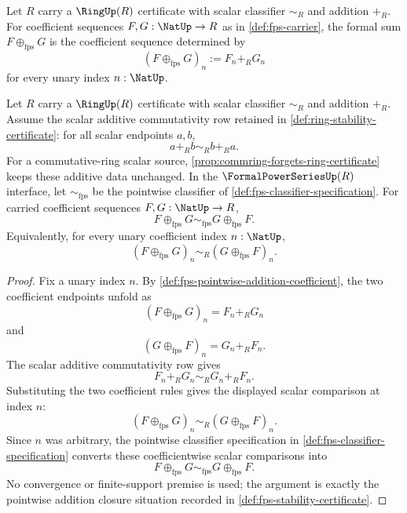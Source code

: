 \begin{definition}
\label{def:fps-pointwise-addition-coefficient}
Let $R$ carry a $\RingUp(R)$ certificate with scalar classifier $\sim_R$ and addition $+_R$. For coefficient sequences $F,G:\NatUp\to R$ as in \autoref{def:fps-carrier}, the formal sum $F\oplus_{\mathrm{fps}}G$ is the coefficient sequence determined by
$$
(F\oplus_{\mathrm{fps}}G)_n:=F_n+_R G_n
$$
for every unary index $n:\NatUp$.
\end{definition}

\begin{theorem}
\label{thm:fps-addition-commutativity-from-scalar-additive-commutativity}
Let $R$ carry a $\RingUp(R)$ certificate with scalar classifier $\sim_R$ and addition $+_R$. Assume the scalar additive commutativity row retained in \autoref{def:ring-stability-certificate}: for all scalar endpoints $a,b$,
$$
a+_R b\sim_R b+_R a.
$$
For a commutative-ring scalar source, \autoref{prop:commring-forgets-ring-certificate} keeps these additive data unchanged. In the $\FormalPowerSeriesUp(R)$ interface, let $\sim_{\mathrm{fps}}$ be the pointwise classifier of \autoref{def:fps-classifier-specification}. For carried coefficient sequences $F,G:\NatUp\to R$,
$$
F\oplus_{\mathrm{fps}}G\sim_{\mathrm{fps}}G\oplus_{\mathrm{fps}}F.
$$
Equivalently, for every unary coefficient index $n:\NatUp$,
$$
(F\oplus_{\mathrm{fps}}G)_n\sim_R(G\oplus_{\mathrm{fps}}F)_n.
$$
\end{theorem}
\begin{proof}
Fix a unary index $n$. By \autoref{def:fps-pointwise-addition-coefficient}, the two coefficient endpoints unfold as
$$
(F\oplus_{\mathrm{fps}}G)_n=F_n+_R G_n
$$
and
$$
(G\oplus_{\mathrm{fps}}F)_n=G_n+_R F_n.
$$
The scalar additive commutativity row gives
$$
F_n+_R G_n\sim_R G_n+_R F_n.
$$
Substituting the two coefficient rules gives the displayed scalar comparison at index $n$:
$$
(F\oplus_{\mathrm{fps}}G)_n\sim_R(G\oplus_{\mathrm{fps}}F)_n.
$$
Since $n$ was arbitrary, the pointwise classifier specification in \autoref{def:fps-classifier-specification} converts these coefficientwise scalar comparisons into
$$
F\oplus_{\mathrm{fps}}G\sim_{\mathrm{fps}}G\oplus_{\mathrm{fps}}F.
$$
No convergence or finite-support premise is used; the argument is exactly the pointwise addition closure situation recorded in \autoref{def:fps-stability-certificate}.
\end{proof}

